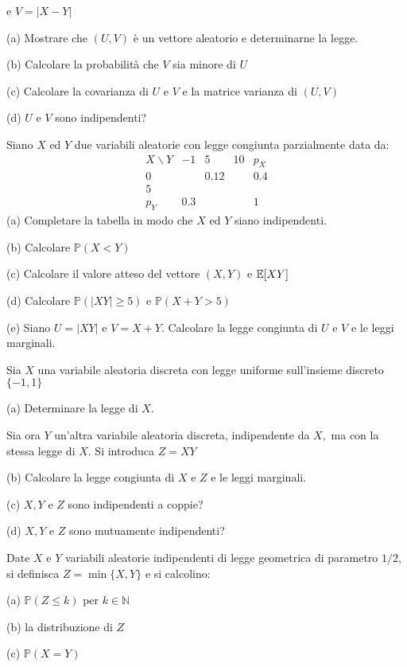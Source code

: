 e $V=|X-Y|$

(a) Mostrare che $(U,V)$ è un vettore aleatorio e determinarne la legge.

(b) Calcolare la probabilità che $V$ sia minore di $U$

(c) Calcolare la covarianza di $U$ e $V$ e la matrice varianza di $(U,V)$

(d) $U$ e $V$ sono indipendenti?
\Esercizio{}

Siano $X$ ed $Y$ due variabili aleatorie con legge congiunta parzialmente data da:
\begin{equation*}
\begin{array}{ c|c|c|c|c }
X\backslash Y & -1 & 5 & 10 & p_{X}\\
\hline
0 &  & 0.12 &  & 0.4\\
\hline
5 &  &  &  & \\
\hline
p_{Y} & 0.3 &  &  & 1
\end{array}
\end{equation*}
(a) Completare la tabella in modo che $X$ ed $Y$ siano indipendenti.

(b) Calcolare $\mathbb{P} (X< Y)$

(c) Calcolare il valore atteso del vettore $(X,Y)$ e $\mathbb{E} [XY]$

(d) Calcolare $\mathbb{P} (|XY|\geq 5)$ e $\mathbb{P} (X+Y >5)$

(e) Siano $U=|XY|$ e $V=X+Y$. Calcolare la legge congiunta di $U$ e $V$ e le leggi marginali.
\Esercizio{}

Sia $X$ una variabile aleatoria discreta con legge uniforme sull'insieme discreto $\{-1,1\}$

(a) Determinare la legge di $X$.

Sia ora $Y$ un'altra variabile aleatoria discreta, indipendente da $X,$ ma con la stessa legge di $X$. Si introduca $Z=XY$

(b) Calcolare la legge congiunta di $X$ e $Z$ e le leggi marginali.

(c) $X,Y$ e $Z$ sono indipendenti a coppie?

(d) $X,Y$ e $Z$ sono mutuamente indipendenti?
\Esercizio{}

Date $X$ e $Y$ variabili aleatorie indipendenti di legge geometrica di parametro $1/2$, si definisca $Z=\min \{X,Y\}$ e si calcolino:

(a) $\mathbb{P} (Z\leq k)$ per $k\in \mathbb{N}$

(b) la distribuzione di $Z$

(c) $\mathbb{P} (X=Y)$

